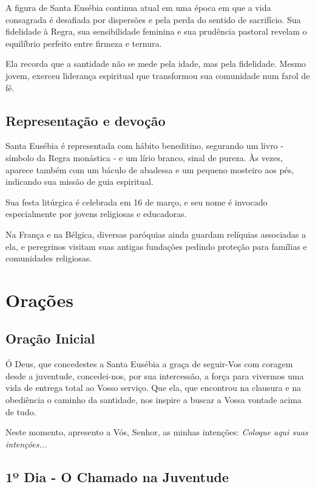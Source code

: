 \documentclass[a4paper,14pt]{extarticle} \usepackage[utf8]{inputenc}
\begin{document}
A figura de Santa Eusébia continua atual em uma época em que a vida consagrada é desafiada por dispersões e pela perda do sentido de sacrifício. Sua fidelidade à Regra, sua sensibilidade feminina e sua prudência pastoral revelam o equilíbrio perfeito entre firmeza e ternura.

Ela recorda que a santidade não se mede pela idade, mas pela fidelidade. Mesmo jovem, exerceu liderança espiritual que transformou sua comunidade num farol de fé.

\subsection{Representação e devoção}

Santa Eusébia é representada com hábito beneditino, segurando um livro - símbolo da Regra monástica - e um lírio branco, sinal de pureza. Às vezes, aparece também com um báculo de abadessa e um pequeno mosteiro aos pés, indicando sua missão de guia espiritual.

Sua festa litúrgica é celebrada em 16 de março, e seu nome é invocado especialmente por jovens religiosas e educadoras.

Na França e na Bélgica, diversas paróquias ainda guardam relíquias associadas a ela, e peregrinos visitam suas antigas fundações pedindo proteção para famílias e comunidades religiosas.

\newpage

\vfill

\section{Orações}
\subsection{Oração Inicial}\label{sub:inicial} %

Ó Deus, que concedestes a Santa Eusébia a graça de seguir-Vos com coragem desde a juventude, concedei-nos, por sua intercessão, a força para vivermos uma vida de entrega total ao Vosso serviço. Que ela, que encontrou na clausura e na obediência o caminho da santidade, nos inspire a buscar a Vossa vontade acima de tudo.

Neste momento, apresento a Vós, Senhor, as minhas intenções:
\textit{Coloque aqui suas intenções...}



\subsection{1º Dia - O Chamado na Juventude}
\end{document}

